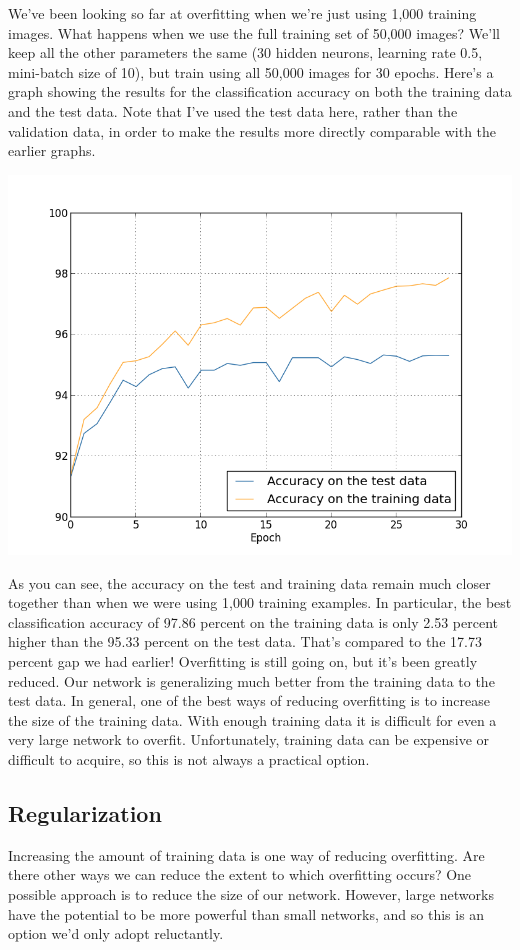 \documentclass[a4paper,twoside,10pt]{book}
\begin{document}
We've been looking so far at overfitting when we're just using 1,000 training images. What happens when we use the full training set of 50,000 images? We'll keep all the other parameters the same (30 hidden neurons, learning rate 0.5, mini-batch size of 10), but train using all 50,000 images for 30 epochs. Here's a graph showing the results for the classification accuracy on both the training data and the test data. Note that I've used the test data here, rather than the validation data, in order to make the results more directly comparable with the earlier graphs.
\begin{center}
	\includegraphics[width=0.7\linewidth]{figures/ch3/overfitting_full}
\end{center}
As you can see, the accuracy on the test and training data remain much closer together than when we were using 1,000 training examples. In particular, the best classification accuracy of 97.86 percent on the training data is only 2.53 percent higher than the 95.33 percent on the test data. That's compared to the 17.73 percent gap we had earlier! Overfitting is still going on, but it's been greatly reduced. Our network is generalizing much better from the training data to the test data. In general, one of the best ways of reducing overfitting is to increase the size of the training data. With enough training data it is difficult for even a very large network to overfit. Unfortunately, training data can be expensive or difficult to acquire, so this is not always a practical option.

\subsection{Regularization}
Increasing the amount of training data is one way of reducing overfitting. Are there other ways we can reduce the extent to which overfitting occurs? One possible approach is to reduce the size of our network. However, large networks have the potential to be more powerful than small networks, and so this is an option we'd only adopt reluctantly.
\end{document}
